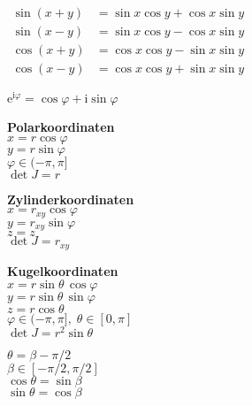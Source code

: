 \documentclass[a4paper,10pt,fleqn,twocolumn,twoside,openany]{scrbook}
\numberwithin{equation}{chapter}
\newcommand{\strong}[1]{{\sffamily\bfseries #1}}
\theoremstyle{Definition}
\newcommand{\ui}{\mathrm i}
\newcommand{\ee}{\mathrm e}
\begin{document}
\noindent
$\!\begin{aligned}
\sin(x+y) &= \sin x\cos y + \cos x\sin y\\
\sin(x-y) &= \sin x\cos y - \cos x\sin y\\
\cos(x+y) &= \cos x\cos y - \sin x\sin y\\
\cos(x-y) &= \cos x\cos y + \sin x\sin y
\end{aligned}$
\vspace{1em}

\noindent
$\ee^{\ui\varphi}=\cos\varphi+\ui\sin\varphi$
\vspace{2em}

\noindent
\strong{Polarkoordinaten}\\
$x=r\cos\varphi$\\
$y=r\sin\varphi$\\
$\varphi\in(-\pi,\pi]$\\
$\det J=r$
\vspace{1em}

\noindent
\strong{Zylinderkoordinaten}\\
$x=r_{xy}\cos\varphi$\\
$y=r_{xy}\sin\varphi$\\
$z=z$\\
$\det J=r_{xy}$
\vspace{1em}

\noindent
\strong{Kugelkoordinaten}\\
$x=r\sin\theta\,\cos\varphi$\\
$y=r\sin\theta\,\sin\varphi$\\
$z=r\cos\theta$\\
$\varphi\in(-\pi,\pi],\;\theta\in[0,\pi]$\\
$\det J=r^2\sin\theta$
\vspace{1em}

\noindent
$\theta=\beta-\pi/2$\\
$\beta\in[-\pi/2,\pi/2]$\\
$\cos\theta=\sin\beta$\\
$\sin\theta=\cos\beta$

\renewcommand{\contentsname}{\sffamily Inhaltsverzeichnis}
\tableofcontents















\printindex
\end{document}
